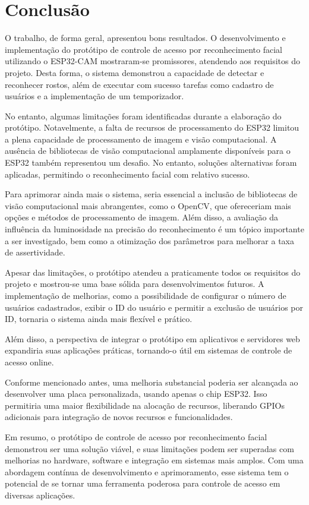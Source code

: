 \chapter{Conclusão}\label{cap:conclusoeseperspectivas}

O trabalho, de forma geral, apresentou bons resultados. O desenvolvimento e 
implementação do protótipo de controle de acesso por 
reconhecimento facial utilizando o ESP32-CAM mostraram-se promissores, atendendo 
aos requisitos do projeto. Desta forma, o sistema demonstrou 
a capacidade de detectar e reconhecer rostos, além de executar com sucesso 
tarefas como cadastro de usuários e a implementação de um temporizador.

No entanto, algumas limitações foram identificadas durante a elaboração do 
protótipo. Notavelmente, a falta de recursos de processamento do ESP32 limitou 
a plena capacidade de processamento de imagem e visão computacional. 
A ausência de bibliotecas de visão computacional amplamente disponíveis 
para o ESP32 também representou um desafio. No entanto, soluções alternativas 
foram aplicadas, permitindo o reconhecimento facial com relativo sucesso.

Para aprimorar ainda mais o sistema, seria essencial a inclusão de bibliotecas 
de visão computacional mais abrangentes, como o OpenCV, que ofereceriam mais 
opções e métodos de processamento de imagem. Além disso, a avaliação da 
influência da luminosidade na precisão do reconhecimento é um tópico importante 
a ser investigado, bem como a otimização dos parâmetros para melhorar a taxa 
de assertividade.

Apesar das limitações, o protótipo atendeu a praticamente todos os requisitos 
do projeto e mostrou-se uma base sólida para desenvolvimentos futuros. A 
implementação de melhorias, como a possibilidade de configurar o número de 
usuários cadastrados, exibir o ID do usuário e permitir a exclusão de usuários 
por ID, tornaria o sistema ainda mais flexível e prático. 

Além disso, a perspectiva de integrar o protótipo em aplicativos e servidores 
web expandiria suas aplicações práticas, tornando-o útil em sistemas de controle 
de acesso online.

Conforme mencionado antes, uma melhoria substancial poderia ser alcançada 
ao desenvolver uma placa personalizada, usando apenas o chip ESP32. Isso permitiria 
uma maior flexibilidade na alocação de recursos, liberando GPIOs adicionais 
para integração de novos recursos e funcionalidades.

Em resumo, o protótipo de controle de acesso por reconhecimento facial 
demonstrou ser uma solução viável, e suas limitações podem ser superadas 
com melhorias no hardware, software e integração em sistemas mais amplos. 
Com uma abordagem contínua de desenvolvimento e aprimoramento, esse sistema 
tem o potencial de se tornar uma ferramenta poderosa para controle de acesso 
em diversas aplicações.